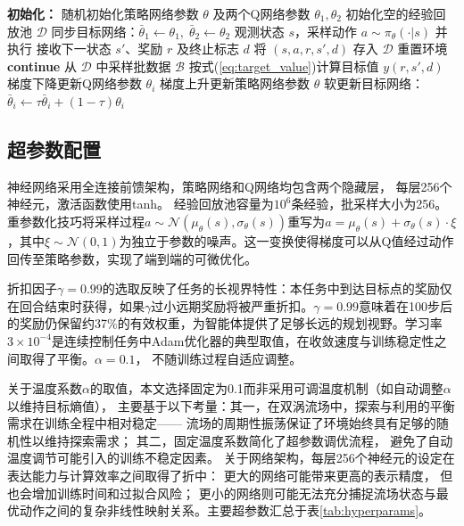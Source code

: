 \begin{algorithm}[htbp]
    \caption{SAC训练流程}
    \label{alg:training}
    \begin{algorithmic}
        \Statex \textbf{初始化：}
        \State 随机初始化策略网络参数 $\theta$ 及两个Q网络参数 $\theta_1, \theta_2$
        \State 初始化空的经验回放池 $\mathcal{D}$
        \State 同步目标网络：$\bar{\theta}_1 \leftarrow \theta_1,\; \bar{\theta}_2 \leftarrow \theta_2$
        \Statex
            \State 观测状态 $s$，采样动作 $a \sim \pi_\theta(\cdot | s)$ 并执行
            \State 接收下一状态 $s'$、奖励 $r$ 及终止标志 $d$
            \State 将 $(s, a, r, s', d)$ 存入 $\mathcal{D}$
                \State 重置环境
                \State \textbf{continue}
            \EndIf
                    \State 从 $\mathcal{D}$ 中采样批数据 $\mathcal{B}$
                    \State 按式(\ref{eq:target_value})计算目标值 $y(r, s', d)$
                    \State 梯度下降更新Q网络参数 $\theta_i$
                    \State 梯度上升更新策略网络参数 $\theta$
                    \State 软更新目标网络：$\bar{\theta}_i \leftarrow \tau \bar{\theta}_i + (1-\tau) \theta_i$
                \EndFor
            \EndIf
        \EndFor
    \end{algorithmic}
\end{algorithm}

\subsection{超参数配置}

神经网络采用全连接前馈架构，策略网络和Q网络均包含两个隐藏层，
每层256个神经元，激活函数使用tanh。
经验回放池容量为$10^6$条经验，批采样大小为256。
重参数化技巧将采样过程$a \sim \mathcal{N}(\mu_\theta(s), \sigma_\theta(s))$重写为$a = \mu_\theta(s) + \sigma_\theta(s) \cdot \xi$，其中$\xi \sim \mathcal{N}(0, 1)$为独立于参数的噪声。这一变换使得梯度可以从Q值经过动作回传至策略参数，实现了端到端的可微优化。

折扣因子$\gamma = 0.99$的选取反映了任务的长视界特性：本任务中到达目标点的奖励仅在回合结束时获得，如果$\gamma$过小远期奖励将被严重折扣。$\gamma = 0.99$意味着在100步后的奖励仍保留约37\%的有效权重，为智能体提供了足够长远的规划视野。学习率$3 \times 10^{-4}$是连续控制任务中Adam优化器的典型取值，在收敛速度与训练稳定性之间取得了平衡。$\alpha = 0.1$，
不随训练过程自适应调整。

关于温度系数$\alpha$的取值，本文选择固定为0.1而非采用可调温度机制（如自动调整$\alpha$以维持目标熵值），
主要基于以下考量：其一，在双涡流场中，探索与利用的平衡需求在训练全程中相对稳定——
流场的周期性振荡保证了环境始终具有足够的随机性以维持探索需求；
其二，固定温度系数简化了超参数调优流程，
避免了自动温度调节可能引入的训练不稳定因素。
关于网络架构，每层256个神经元的设定在表达能力与计算效率之间取得了折中：
更大的网络可能带来更高的表示精度，
但也会增加训练时间和过拟合风险；
更小的网络则可能无法充分捕捉流场状态与最优动作之间的复杂非线性映射关系。主要超参数汇总于表\ref{tab:hyperparams}。

